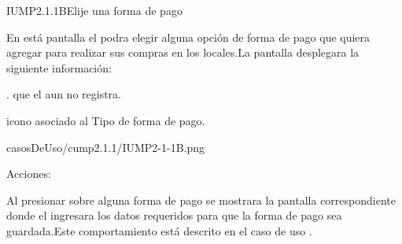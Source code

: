 \begin{IU}{IUMP2.1.1B}{Elije una forma de pago}{En está pantalla el  podra elegir alguna opción de forma de pago que quiera agregar para realizar sus compras en los locales.La pantalla desplegara la siguiente información:
	\begin{Citemize}
		\item {}. que el  aun no registra.
		\item icono asociado al Tipo de forma de pago.
	\end{Citemize}}
{casosDeUso/cump2.1.1/IUMP2-1-1B.png}
	\item[Acciones:]
		\item Al presionar sobre alguna forma de pago se mostrara la pantalla correspondiente donde el  ingresara los datos requeridos para 	que la forma de pago sea guardada.Este comportamiento está descrito en el caso de uso  .
\end{IU}